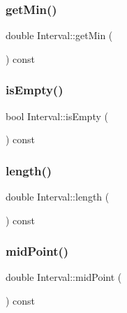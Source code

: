 \mbox{\label{classInterval_ac899eee4bd4a58aff49b7f66f0faa0af}} 
\subsubsection{\texorpdfstring{getMin()}{getMin()}}
{\footnotesize\ttfamily double Interval\+::get\+Min (\begin{DoxyParamCaption}{ }\end{DoxyParamCaption}) const}

\mbox{\label{classInterval_abbee4d022a104dbeda34f1e02942536c}} 
\subsubsection{\texorpdfstring{isEmpty()}{isEmpty()}}
{\footnotesize\ttfamily bool Interval\+::is\+Empty (\begin{DoxyParamCaption}{ }\end{DoxyParamCaption}) const}

\mbox{\label{classInterval_ad60d36e883307c5a82f500a1c2a9c876}} 
\subsubsection{\texorpdfstring{length()}{length()}}
{\footnotesize\ttfamily double Interval\+::length (\begin{DoxyParamCaption}{ }\end{DoxyParamCaption}) const}

\mbox{\label{classInterval_a8e8d9961ecc6ac0d76162f4a8e15d553}} 
\subsubsection{\texorpdfstring{midPoint()}{midPoint()}}
{\footnotesize\ttfamily double Interval\+::mid\+Point (\begin{DoxyParamCaption}{ }\end{DoxyParamCaption}) const}

